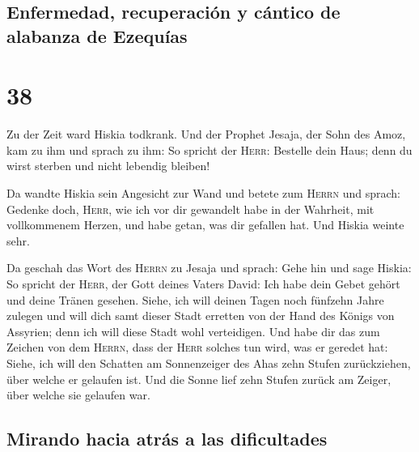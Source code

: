 \hypertarget{enfermedad-recuperaciuxf3n-y-cuxe1ntico-de-alabanza-de-ezequuxedas}{%
\subsection{Enfermedad, recuperación y cántico de alabanza de
Ezequías}\label{enfermedad-recuperaciuxf3n-y-cuxe1ntico-de-alabanza-de-ezequuxedas}}

\hypertarget{section-37}{%
\section{38}\label{section-37}}

 Zu der Zeit ward Hiskia todkrank. Und der Prophet Jesaja,
der Sohn des Amoz, kam zu ihm und sprach zu ihm: So spricht der
\textsc{Herr}: Bestelle dein Haus; denn du wirst sterben und nicht
lebendig bleiben!

 Da wandte Hiskia sein Angesicht zur Wand und betete zum
\textsc{Herrn}  und sprach: Gedenke doch, \textsc{Herr},
wie ich vor dir gewandelt habe in der Wahrheit, mit vollkommenem Herzen,
und habe getan, was dir gefallen hat. Und Hiskia weinte sehr.

 Da geschah das Wort des \textsc{Herrn} zu Jesaja und
sprach:  Gehe hin und sage Hiskia: So spricht der
\textsc{Herr}, der Gott deines Vaters David: Ich habe dein Gebet gehört
und deine Tränen gesehen. Siehe, ich will deinen Tagen noch fünfzehn
Jahre zulegen  und will dich samt dieser Stadt erretten
von der Hand des Königs von Assyrien; denn ich will diese Stadt wohl
verteidigen.  Und habe dir das zum Zeichen von dem
\textsc{Herrn}, dass der \textsc{Herr} solches tun wird, was er geredet
hat:  Siehe, ich will den Schatten am Sonnenzeiger des
Ahas zehn Stufen zurückziehen, über welche er gelaufen ist. Und die
Sonne lief zehn Stufen zurück am Zeiger, über welche sie gelaufen war.

\hypertarget{mirando-hacia-atruxe1s-a-las-dificultades}{%
\subsection{Mirando hacia atrás a las
dificultades}\label{mirando-hacia-atruxe1s-a-las-dificultades}}

